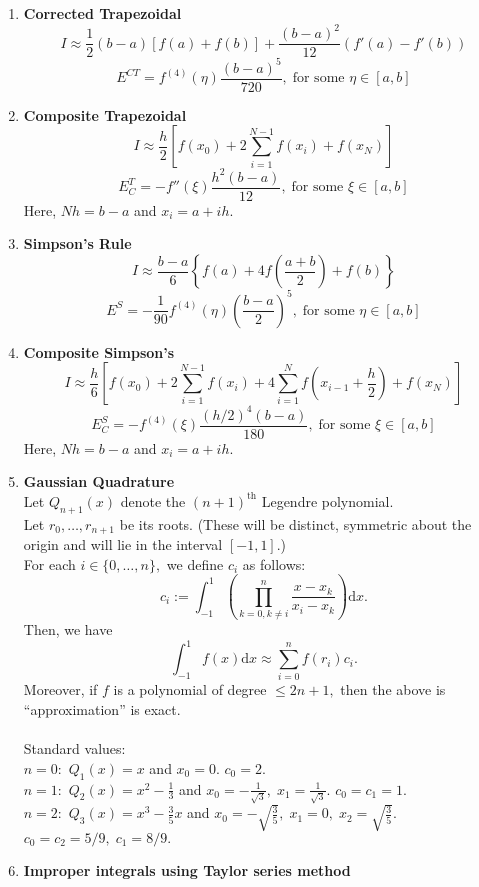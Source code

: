 \documentclass{article}
\begin{document}
\begin{enumerate}
	\item \textbf{Corrected Trapezoidal}
	\[I \approx \frac{1}{2}(b - a)[f(a) + f(b)] + \frac{(b - a)^2}{12}(f'(a) - f'(b))\]
	\[E^{CT} = f^{(4)}(\eta)\frac{(b - a)^5}{720},\;\text{for some }\eta\in[a, b]\]
	\item \textbf{Composite Trapezoidal}
	\[I \approx \frac{h}{2}\left[f(x_0) + 2\sum_{i=1}^{N-1}f(x_i) + f(x_N)\right]\]
	\[E_C^{T} = -f''(\xi)\frac{h^2(b-a)}{12},\;\text{for some }\xi\in[a, b]\]
	Here, $Nh = b-a$ and $x_i = a + ih.$\\
	\item \textbf{Simpson's Rule}
	\[I \approx \frac{b - a}{6}\left\{f(a) + 4f\left(\frac{a + b}{2}\right) + f(b)\right\}\]
	\[E^S = -\frac{1}{90}f^{(4)}(\eta)\left(\frac{b-a}{2}\right)^5,\;\text{for some }\eta\in[a, b]\]
	\item \textbf{Composite Simpson's}
	\[I \approx \frac{h}{6}\left[f(x_0) + 2\sum_{i=1}^{N-1}f(x_i) + 4\sum_{i=1}^{N}f\left(x_{i-1} + \frac{h}{2}\right) + f(x_N)\right]\]
	\[E_C^{S} = -f^{(4)}(\xi)\frac{(h/2)^4(b-a)}{180},\;\text{for some }\xi\in[a, b]\]
	Here, $Nh = b-a$ and $x_i = a + ih.$\\
	\item \textbf{Gaussian Quadrature}\\
	Let $Q_{n+1}(x)$ denote the $(n+1)^{\text{th}}$ Legendre polynomial.\\
	Let $r_0, \ldots, r_{n+1}$ be its roots. (These will be distinct, symmetric about the origin and will lie in the interval $[-1, 1].$)\\
	For each $i \in \{0, \ldots, n\},$ we define $c_i$ as follows:
	\[c_i := \int_{-1}^{1} \left(\prod_{k = 0, k \neq i}^{n}\frac{x - x_k}{x_i - x_k}\right) \text{d}x.\]
	Then, we have
	\[\int_{-1}^{1} f(x) \text{d}x \approx \displaystyle\sum_{i=0}^{n}f(r_i)c_i.\]
	Moreover, if $f$ is a polynomial of degree $\le 2n+1,$ then the above is ``approximation'' is exact.\\~\\
	Standard values: \\
	$n = 0:$ $Q_1(x) = x$ and $x_0 = 0.$ $c_0 = 2.$\\
	$n = 1:$ $Q_2(x) = x^2 - \frac{1}{3}$ and $x_0 = -\frac{1}{\sqrt{3}},\;x_1 = \frac{1}{\sqrt{3}}.$ $c_0 = c_1 = 1.$\\
	$n = 2:$ $Q_3(x) = x^3 - \frac{3}{5}x$ and $x_0 = -\sqrt{\frac{3}{5}},\;x_1 = 0,\; x_2 = \sqrt{\frac{3}{5}}.$ $c_0 = c_2 = 5/9,\;c_1 = 8/9.$
	\item \textbf{Improper integrals using Taylor series method}\\

\end{enumerate}
\end{document}
